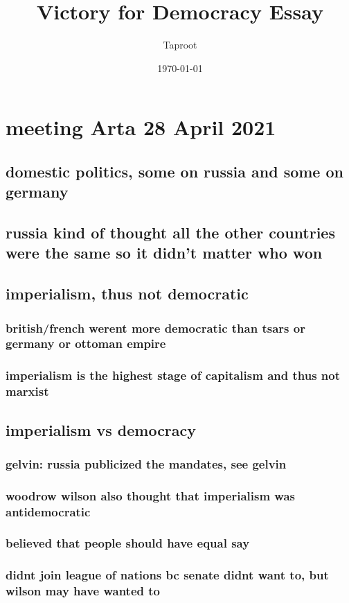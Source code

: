 \documentclass[letterpaper]{article}
\author{Taproot}
\date{\today}
\title{Victory for Democracy Essay}
\renewcommand{\tableofcontents}{}
\begin{document}
\tableofcontents

\section{meeting Arta 28 April 2021}
\label{sec:org544eeeb}
\subsection{domestic politics, some on russia and some on germany}
\label{sec:orge06e8a6}
\subsection{russia kind of thought all the other countries were the same so it didn't matter who won}
\label{sec:orgf54b969}
\subsection{imperialism, thus not democratic}
\label{sec:org130364b}
\subsubsection{british/french werent more democratic than tsars or germany or ottoman empire}
\label{sec:orgd302ea4}
\subsubsection{imperialism is the highest stage of capitalism and thus not marxist}
\label{sec:org708162f}
\subsection{imperialism vs democracy}
\label{sec:org977d9a2}
\subsubsection{gelvin: russia publicized the mandates, see gelvin}
\label{sec:org60fce38}
\subsubsection{woodrow wilson also thought that imperialism was antidemocratic}
\label{sec:orgb07648a}
\subsubsection{believed that people should have equal say}
\label{sec:org391f019}
\subsubsection{didnt join league of nations bc senate didnt want to, but wilson may have wanted to}
\label{sec:org14f6a06}
\end{document}
